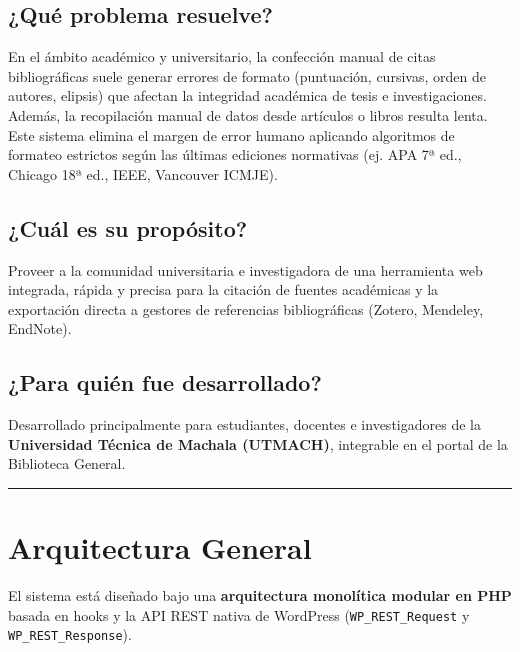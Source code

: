 \documentclass[11pt, a4paper]{article}
\begin{document}
\subsection{¿Qué problema resuelve?}
En el ámbito académico y universitario, la confección manual de citas bibliográficas suele generar errores de formato (puntuación, cursivas, orden de autores, elipsis) que afectan la integridad académica de tesis e investigaciones. Además, la recopilación manual de datos desde artículos o libros resulta lenta. Este sistema elimina el margen de error humano aplicando algoritmos de formateo estrictos según las últimas ediciones normativas (ej. APA 7ª ed., Chicago 18ª ed., IEEE, Vancouver ICMJE).


\subsection{¿Cuál es su propósito?}
Proveer a la comunidad universitaria e investigadora de una herramienta web integrada, rápida y precisa para la citación de fuentes académicas y la exportación directa a gestores de referencias bibliográficas (Zotero, Mendeley, EndNote).


\subsection{¿Para quién fue desarrollado?}
Desarrollado principalmente para estudiantes, docentes e investigadores de la \textbf{Universidad Técnica de Machala (UTMACH)}, integrable en el portal de la Biblioteca General.



\bigskip\noindent\rule{\textwidth}{0.4pt}\bigskip


\section{Arquitectura General}

El sistema está diseñado bajo una \textbf{arquitectura monolítica modular en PHP} basada en hooks y la API REST nativa de WordPress (\texttt{WP\_REST\_Request} y \texttt{WP\_REST\_Response}).
\end{document}
